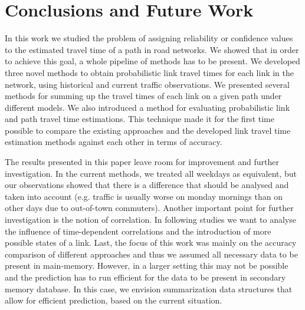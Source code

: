 \section{Conclusions and Future Work}
\label{sec:conclusion}
In this work we studied the problem of assigning reliability or confidence
values to the estimated travel time of a path in road networks. We showed
that in order to achieve this goal, a whole pipeline of methods has to be
present. We developed three novel methods to obtain probabilistic link
travel times for each link in the network, using historical and
current traffic observations. We presented several methods for summing up
the travel times of each link on a given path under different models. We also
introduced a method for evaluating probabilistic link and path travel time
estimations. This technique made it for the first time possible to compare the
existing approaches and the developed link travel time estimation methods
against each other in terms of accuracy.

The results presented in this paper leave room for improvement and further
investigation. In the current methods, we treated all weekdays as equivalent,
but our observations showed that there is a difference that should be
analysed and taken into account (e.g. traffic is usually worse on monday
mornings than on other days due to out-of-town commuters). Another important
point for further investigation is the notion of correlation. In following
studies we want to analyse the influence of time-dependent correlations and the
introduction of more possible states of a link. Last, the focus of this work was
mainly on the accuracy comparison of different approaches and thus we assumed
all necessary data to be present in main-memory. However, in a larger setting
this may not be possible and the prediction has to run efficient for the data
to be present in secondary memory database. In this case, we envision
summarization data structures that allow for efficient prediction, based on the
current situation.
